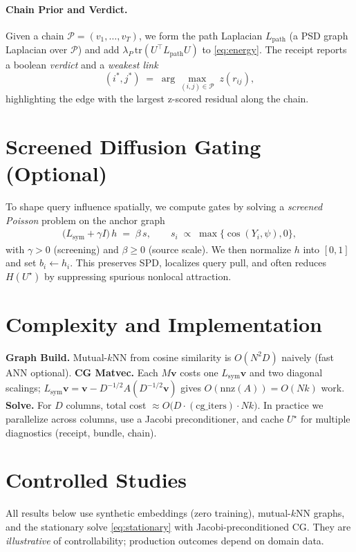 \documentclass[11pt]{article}
\begin{document}
\paragraph{Chain Prior and Verdict.}
Given a chain $\mathcal{P}=(v_1,\ldots,v_T)$, we form the path Laplacian $L_{\mathrm{path}}$ (a PSD graph Laplacian over $\mathcal{P}$) and add $\lambda_P\,\mathrm{tr}(U^\top L_{\mathrm{path}}U)$ to \eqref{eq:energy}. The receipt reports a boolean \emph{verdict} and a \emph{weakest link}
\[
(i^\ast,j^\ast) \;=\; \arg\max_{(i,j)\in \mathcal{P}} \; z(r_{ij}),
\]
highlighting the edge with the largest z-scored residual along the chain.

\vspace{-0.5em}
\section{Screened Diffusion Gating (Optional)}
To shape query influence spatially, we compute gates by solving a \emph{screened Poisson} problem on the anchor graph
\begin{align}
\label{eq:screened}
\Big(L_{\mathrm{sym}} + \gamma I\Big) \, h \;=\; \beta \, s,
\qquad s_i \;\propto\; \max\{\cos(Y_i,\psi),0\},
\end{align}
with $\gamma>0$ (screening) and $\beta\ge 0$ (source scale). We then normalize $h$ into $[0,1]$ and set $b_i \leftarrow h_i$. This preserves SPD, localizes query pull, and often reduces $H(U^\star)$ by suppressing spurious nonlocal attraction.

\vspace{-0.5em}
\section{Complexity and Implementation}
\textbf{Graph Build.} Mutual-$k$NN from cosine similarity is $O(N^2D)$ naively (fast ANN optional).  
\textbf{CG Matvec.} Each $M\mathbf{v}$ costs one $L_{\mathrm{sym}}\mathbf{v}$ and two diagonal scalings; $L_{\mathrm{sym}}\mathbf{v}=\mathbf{v}-D^{-1/2}A(D^{-1/2}\mathbf{v})$ gives $O(\mathrm{nnz}(A))\!=O(Nk)$ work.  
\textbf{Solve.} For $D$ columns, total cost $\approx O\big(D\cdot (\mathrm{cg\_iters})\cdot Nk\big)$. In practice we parallelize across columns, use a Jacobi preconditioner, and cache $U^\star$ for multiple diagnostics (receipt, bundle, chain).

\vspace{-0.5em}
\section{Controlled Studies}
All results below use synthetic embeddings (zero training), mutual-$k$NN graphs, and the stationary solve \eqref{eq:stationary} with Jacobi-preconditioned CG. They are \emph{illustrative} of controllability; production outcomes depend on domain data.
\end{document}
